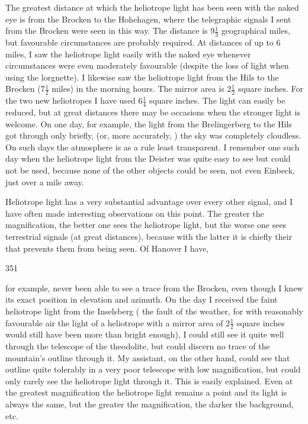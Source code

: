 \par\noindent\hspace*{\parindent}The greatest distance at which the heliotrope light has been seen with the naked eye is from the Brocken to the Hohehagen, where the telegraphic signals I sent from the Brocken were seen in this way. The distance is \(9\frac{1}{3}\) geographical miles, but favourable circumstances are probably required.
At distances of up to 6 miles, I saw the heliotrope light easily with the naked eye whenever circumstances were even moderately favourable (despite the loss of light when using the lorgnette). I likewise saw the heliotrope light from the Hils to the Brocken (\(7\frac{1}{2}\) miles) in the morning hours.
The mirror area is \(2\frac{1}{2}\) square inches. For the two new heliotropes I have used \(6\frac{1}{4}\) square inches. The light can easily be reduced, but at great distances there may be occasions when the stronger light is welcome. On one day, for example, the light from the Brelingerberg to the Hils got through only briefly,  (or, more accurately, ) the sky was completely cloudless.
On such days the atmosphere is as a rule least transparent. I remember one such day when the heliotrope light from the Deister was quite easy to see but could not be used, because none of the other objects could be seen, not even Einbeck, just over a mile away.

\par\noindent\hspace*{\parindent}Heliotrope light has a very substantial advantage over every other signal, and I have often made interesting observations on this point. The greater the magnification, the better one sees the heliotrope light, but the worse one sees terrestrial signals (at great distances), because with the latter it is chiefly their  that prevents them from being seen. Of Hanover I have,
\par\clearpage
{}\hfill351\par\medskip
\noindent for example, never been able to see a trace from the Brocken, even though I knew its exact position in elevation and azimuth.
On the day I received the faint heliotrope light from the Inselsberg ( the fault of the weather, for with reasonably favourable air the light of a heliotrope with a mirror area of \(2\frac{1}{2}\) square inches would still have been more than bright enough), I could still see it quite well through the telescope of the theodolite, but could discern no trace of the mountain's outline through it. My assistant, on the other hand, could see that outline quite tolerably in a very poor telescope with low magnification, but could only rarely see the heliotrope light through it.
This is easily explained. Even at the greatest magnification the heliotrope light remains a point and its light is always the same, but the greater the magnification, the darker the background, etc.

